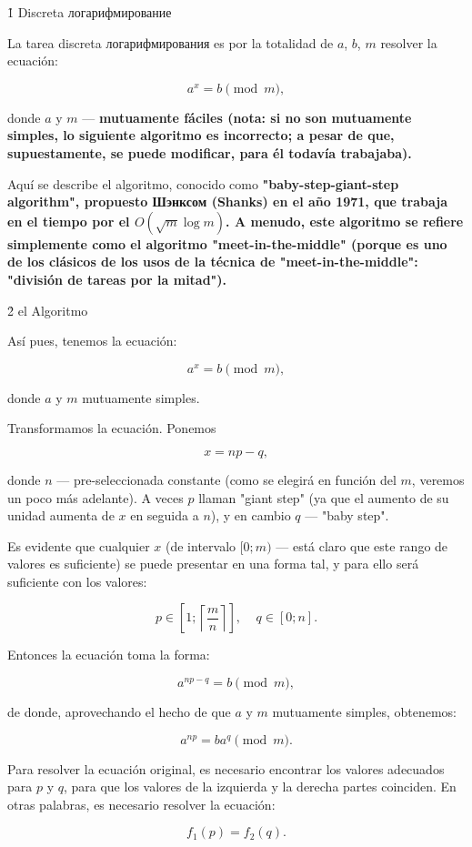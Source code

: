 \h1{ Discreta логарифмирование }

La tarea discreta логарифмирования es por la totalidad de $a$, $b$, $m$ resolver la ecuación:

$$ a^x = b \pmod m, $$

donde $a$ y $m$ --- \bf{mutuamente fáciles} (nota: si no son mutuamente simples, lo siguiente algoritmo es incorrecto; a pesar de que, supuestamente, se puede modificar, para él todavía trabajaba).

Aquí se describe el algoritmo, conocido como \bf{"baby-step-giant-step algorithm"}, propuesto \bf{Шэнксом (Shanks)} en el año 1971, que trabaja en el tiempo por el $O (\sqrt{m} \log m)$. A menudo, este algoritmo se refiere simplemente como el algoritmo \bf{"meet-in-the-middle"} (porque es uno de los clásicos de los usos de la técnica de "meet-in-the-middle": "división de tareas por la mitad").


\h2{ el Algoritmo }

Así pues, tenemos la ecuación:

$$ a^x = b \pmod m, $$

donde $a$ y $m$ mutuamente simples.

Transformamos la ecuación. Ponemos

$$ x = np - q, $$

donde $n$ --- pre-seleccionada constante (como se elegirá en función del $m$, veremos un poco más adelante). A veces $p$ llaman "giant step" (ya que el aumento de su unidad aumenta de $x$ en seguida a $n$), y en cambio $q$ --- "baby step".

Es evidente que cualquier $x$ (de intervalo $[0;m)$ --- está claro que este rango de valores es suficiente) se puede presentar en una forma tal, y para ello será suficiente con los valores:

$$ p \in \left[ 1; \left\lceil \frac{m}{n} \right\rceil \right], ~~~~~ q \in [0;n]. $$

Entonces la ecuación toma la forma:

$$ a^{np-q} = b \pmod m, $$

de donde, aprovechando el hecho de que $a$ y $m$ mutuamente simples, obtenemos:

$$ a^{np} = b a^q \pmod m. $$

Para resolver la ecuación original, es necesario encontrar los valores adecuados para $p$ y $q$, para que los valores de la izquierda y la derecha partes coinciden. En otras palabras, es necesario resolver la ecuación:

$$ f_1(p) = f_2(q). $$

